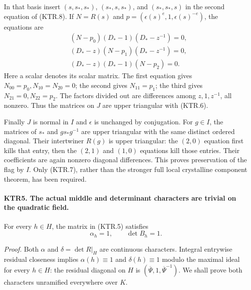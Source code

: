 In that basis insert \((s,s_*,s_*)\),
\((s_*,s,s_*)\), and \((s_*,s_*,s)\) in the second
equation of (KTR.8).  If \(N=R(s)\) and
\(p=(\epsilon(s)^e,1,\epsilon(s)^{-e})\), the equations are
\[
 \begin{split}
 &(N-p_0)(D_*-1)(D_*-z^{-1})=0,\\
 &(D_*-z)(N-p_1)(D_*-z^{-1})=0,\\
 &(D_*-z)(D_*-1)(N-p_2)=0.
 \end{split}
 \tag{KTR.9}
\]
Here a scalar denotes its scalar matrix.  The first equation
gives \(N_{00}=p_0,N_{10}=N_{20}=0\); the second gives
\(N_{11}=p_1\); the third gives
\(N_{21}=0,N_{22}=p_2\).  The factors divided out are
differences among \(z,1,z^{-1}\), all nonzero.  Thus the
matrices on \(J\) are upper triangular with (KTR.6).

Finally \(J\) is normal in \(I\) and \(\epsilon\) is
unchanged by conjugation.  For \(g\in I\), the matrices of
\(s_*\) and \(g s_*g^{-1}\) are upper triangular with the
same distinct ordered diagonal.  Their intertwiner \(R(g)\)
is upper triangular: the \((2,0)\) equation first kills that
entry, then the \((2,1)\) and \((1,0)\) equations kill those
entries.  Their coefficients are again nonzero diagonal
differences.  This proves preservation of the flag by \(I\).
Only (KTR.7), rather than the stronger full local crystalline
component theorem, has been required.

\paragraph{KTR5. The actual middle and determinant characters are trivial on the quadratic field.}
\label{claim:KTR5}
For every \(h\in H\), the matrix in (KTR.5) satisfies
\[
                          \alpha_h=1,\qquad \det B_h=1.
 \tag{KTR.10}
\]

\emph{Proof.}
Both \(\alpha\) and \(\delta=\det R|_H\) are continuous
characters.  Integral entrywise residual closeness implies
\(\alpha(h)\equiv1\) and \(\delta(h)\equiv1\) modulo
the maximal ideal for every \(h\in H\): the residual diagonal
on \(H\) is \((\overline\Psi,1,\overline\Psi^{-1})\).
We shall prove both characters unramified everywhere over \(K\).


